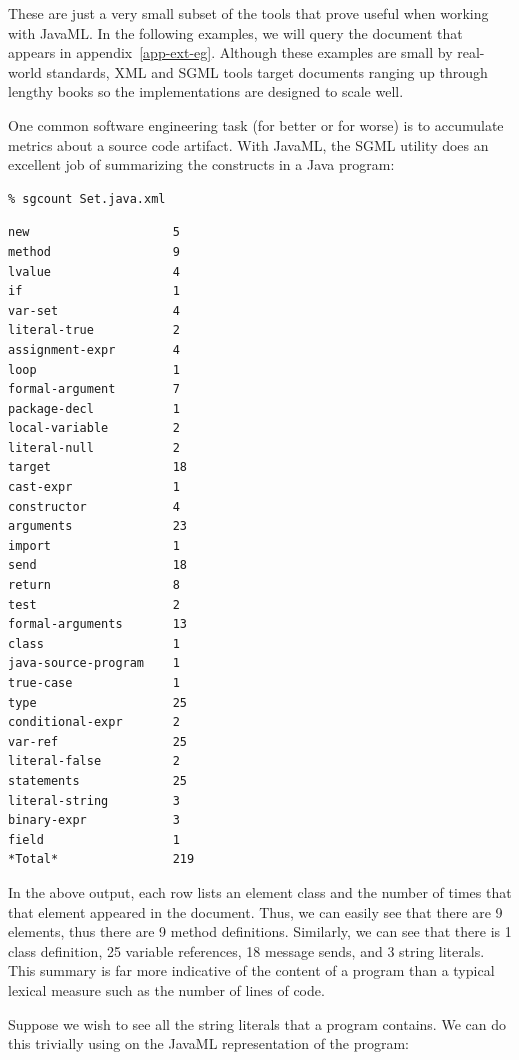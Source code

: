 \documentclass{article}
\begin{document}
These are just a very small subset of the tools that prove useful when
working with JavaML.  In the following examples, we will query the
 document that appears in
appendix~\ref{app-ext-eg}.  Although these examples are small by
real-world standards, XML and SGML tools target documents ranging up
through lengthy books so the implementations are designed to scale well.

One common software engineering task (for better or for worse) is to
accumulate metrics about a source code artifact.  With JavaML, the SGML
utility  does an excellent job of summarizing the
constructs in a Java program:

{\bfseries
\begin{verbatim}
% sgcount Set.java.xml
\end{verbatim}
}
{\small
\begin{verbatim}
new                    5  
method                 9  
lvalue                 4  
if                     1  
var-set                4  
literal-true           2  
assignment-expr        4  
loop                   1  
formal-argument        7  
package-decl           1  
local-variable         2  
literal-null           2  
target                 18 
cast-expr              1  
constructor            4  
arguments              23 
import                 1  
send                   18 
return                 8  
test                   2  
formal-arguments       13 
class                  1  
java-source-program    1  
true-case              1  
type                   25 
conditional-expr       2  
var-ref                25 
literal-false          2  
statements             25 
literal-string         3  
binary-expr            3  
field                  1  
*Total*                219 
\end{verbatim}
}

In the above output, each row lists an element class and the number of
times that that element appeared in the document.  Thus, we can easily
see that there are 9  elements, thus there are 9
method definitions.  Similarly, we can see that there is 1 class
definition, 25 variable references, 18 message sends, and 3 string
literals.  This summary is far more indicative of the content of a
program than a typical lexical measure such as the number of lines of
code.

Suppose we wish to see all the string literals that a program contains.
We can do this trivially using  on the JavaML
representation of the program:
\end{document}
